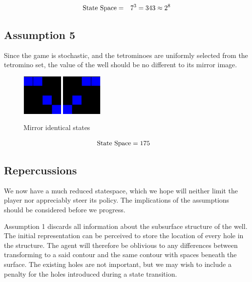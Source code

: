 \documentclass{rucsthesis}
\begin{document}
\begin{eqnarray}
\centering
\textrm{State Space} & = & 7^{3} = 343 \approx 2^{8}
\end{eqnarray}

\subsection*{Assumption 5}

Since the game is stochastic, and the tetrominoes are uniformly selected from the tetromino set, the value of the well should be no different to its mirror image.

\begin{figure}[h]
\centering
\includegraphics[width=0.8in]{reducedwell.png}
\includegraphics[width=0.8in]{mirrorwell.png}
\caption{Mirror identical states}
\label{fig:mirrorwell}
\end{figure}

\begin{eqnarray}
\centering
\textrm{State Space} & = 175
\end{eqnarray}

\subsection*{Repercussions}

We now have a much reduced statespace, which we hope will neither limit the player nor appreciably steer its policy. The implications of the assumptions should be considered before we progress.

Assumption 1 discards all information about the subsurface structure of the well. The initial representation can be perceived to store the location of every hole in the structure. The agent will therefore be oblivious to any differences between transforming to a said contour and the same contour with spaces beneath the surface. The existing holes are not important, but we may wish to include a penalty for the holes introduced during a state transition.
\end{document}
